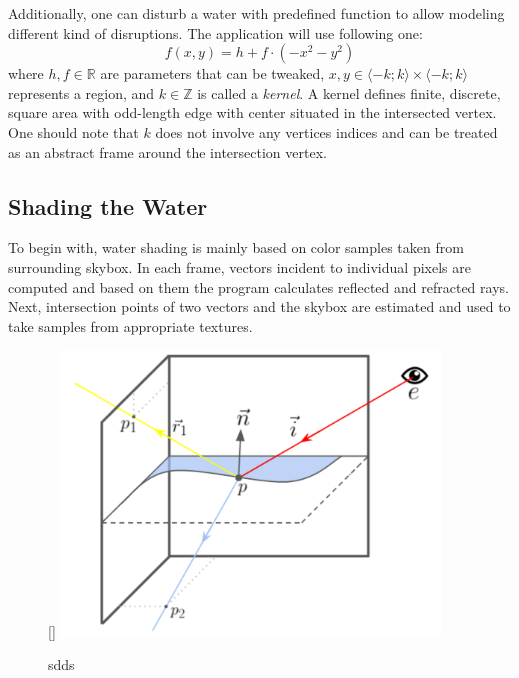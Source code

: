 \documentclass{report}
\begin{document}
Additionally, one can disturb a water with predefined function to allow modeling different kind of disruptions. The application will use following one:
\begin{equation}
f(x,y) = h + f \cdot (-x^{2} - y^{2})
\end{equation}
where $h, f \in \mathbb{R}$ are parameters that can be tweaked, $x,y \in \langle -k ; k \rangle \times \langle -k ; k \rangle $ represents a region, and $k \in \mathbb{Z}$ is called a \textit{kernel}. A kernel defines finite, discrete, square area with odd-length edge with center situated in the intersected vertex. One should note that $k$ does not involve any vertices indices and can be treated as an abstract frame around the intersection vertex. 


\subsection{Shading the Water} \label{subsection:water_shading}
To begin with, water shading is mainly based on color samples taken from surrounding skybox. In each frame, vectors incident to individual pixels are computed and based on them the program calculates reflected and refracted rays. Next, intersection points of two vectors and the skybox are estimated and used to take samples from appropriate textures.

\begin{figure}
  \raisebox{0pt}[\dimexpr{}\baselineskip\relax]
  {
    \includegraphics[width=0.9\textwidth]{images/reflection_refraction.pdf}
  }
  \caption{sdds}
  \label{fig:reflection_refraction}
\end{figure}
\end{document}
